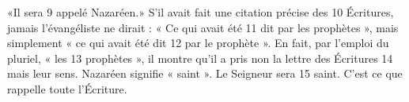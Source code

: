 «Il sera	 
9	 	appelé Nazaréen.» S'il avait fait une citation précise des	 
10	 	Écritures, jamais l'évangéliste ne dirait : « Ce qui avait été	 
11	 	dit par les prophètes », mais simplement « ce qui avait été dit	 
12	 	par le prophète ». En fait, par l'emploi du pluriel, « les	 
13	 	prophètes », il montre qu'il a pris non la lettre des Écritures	 
14	 	mais leur sens. Nazaréen signifie « saint ». Le Seigneur sera	 
15	 	saint. C'est ce que rappelle toute l'Écriture.